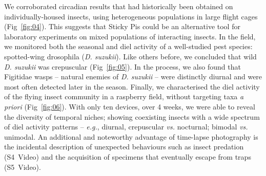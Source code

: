 \documentclass[12pt]{article}
\begin{document}
\begin{linenumbers}
		We corroborated circadian results that had historically been obtained on individually-housed insects, using heterogeneous populations in large flight cages (Fig~\ref{fig:04}). This suggests that Sticky Pis could be an alternative tool for laboratory experiments on mixed populations of interacting insects. In the field, we monitored both the seasonal and diel activity of a well-studied pest species: spotted-wing drosophila (\emph{D. suzukii}). Like others before\cite{swoboda-bhattarai_diurnal_2020}, we concluded that wild \emph{D. suzukii} was crepuscular (Fig~\ref{fig:05}). In the process, we also found that Figitidae wasps – natural enemies of \emph{D. suzukii} – were distinctly diurnal and were most often detected later in the season. Finally, we characterised the diel activity of the flying insect community in a raspberry field, without targeting taxa \emph{a priori} (Fig~\ref{fig:06}). With only ten devices, over 4 weeks, we were able to reveal the diversity of temporal niches; showing coexisting insects with a wide spectrum of diel activity patterns – \emph{e.g.}, diurnal, crepuscular \emph{vs.} nocturnal; bimodal \emph{vs.} unimodal. An additional and noteworthy advantage of time-lapse photography is the incidental description of unexpected behaviours such as insect predation (S4~Video) and the acquisition of specimens that eventually escape from traps  (S5~Video).
		

\end{linenumbers}
\end{document}
